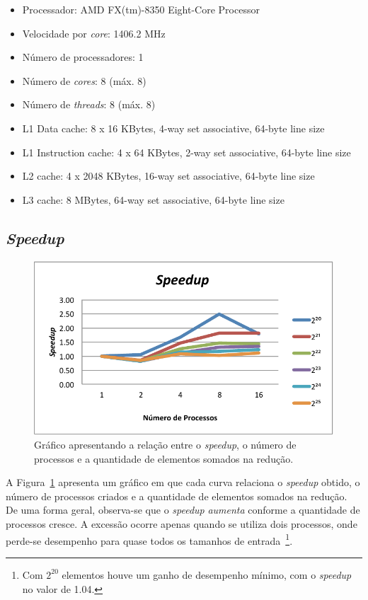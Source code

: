 \documentclass[12pt,a4paper]{article}
\begin{document}
\begin{itemize}
    \item Processador: AMD FX(tm)-8350 Eight-Core Processor
    \item Velocidade por \textit{core}: 1406.2 MHz
    \item Número de processadores: 1
    \item Número de \textit{cores}: 8 (máx. 8)
    \item Número de \textit{threads}: 8 (máx. 8)
    \item L1 Data cache: 8 x 16 KBytes, 4-way set associative, 64-byte line size
    \item L1 Instruction cache: 4 x 64 KBytes, 2-way set associative, 64-byte line size
    \item L2 cache: 4 x 2048 KBytes, 16-way set associative, 64-byte line size
    \item L3 cache: 8 MBytes, 64-way set associative, 64-byte line size
\end{itemize}


\subsection{\textit{Speedup}}
\begin{figure}[h!]
\centering
\includegraphics{img/speedup.pdf}
\caption{Gráfico apresentando a relação entre o \textit{speedup}, o número de
processos e a quantidade de elementos somados na redução.}
\label{fig:speedup}
\end{figure}

A Figura~\ref{fig:speedup} apresenta um gráfico em que cada curva relaciona o
\textit{speedup} obtido, o número de processos criados e a quantidade de
elementos somados na redução. De uma forma geral, observa-se que o
\textit{speedup} \emph{aumenta} conforme a quantidade de processos cresce. A
excessão ocorre apenas quando se utiliza dois processos, onde perde-se
desempenho para quase todos os tamanhos de entrada~\footnote{Com $2^{20}$
elementos houve um ganho de desempenho mínimo, com o \textit{speedup} no valor
de 1.04.}.
\end{document}
